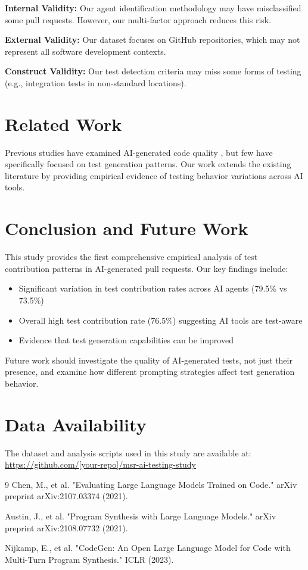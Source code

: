\documentclass[conference]{IEEEtran}
\begin{document}
\textbf{Internal Validity:} Our agent identification methodology may have misclassified some pull requests. However, our multi-factor approach reduces this risk.

\textbf{External Validity:} Our dataset focuses on GitHub repositories, which may not represent all software development contexts.

\textbf{Construct Validity:} Our test detection criteria may miss some forms of testing (e.g., integration tests in non-standard locations).

\section{Related Work}

Previous studies have examined AI-generated code quality \cite{ref1}, but few have specifically focused on test generation patterns. Our work extends the existing literature by providing empirical evidence of testing behavior variations across AI tools.

\section{Conclusion and Future Work}

This study provides the first comprehensive empirical analysis of test contribution patterns in AI-generated pull requests. Our key findings include:

\begin{itemize}
    \item Significant variation in test contribution rates across AI agents (79.5\% vs 73.5\%)
    \item Overall high test contribution rate (76.5\%) suggesting AI tools are test-aware
    \item Evidence that test generation capabilities can be improved
\end{itemize}

Future work should investigate the quality of AI-generated tests, not just their presence, and examine how different prompting strategies affect test generation behavior.

\section{Data Availability}

The dataset and analysis scripts used in this study are available at: \url{https://github.com/[your-repo]/msr-ai-testing-study}

\begin{thebibliography}{9}
 Chen, M., et al. "Evaluating Large Language Models Trained on Code." arXiv preprint arXiv:2107.03374 (2021).

 Austin, J., et al. "Program Synthesis with Large Language Models." arXiv preprint arXiv:2108.07732 (2021).

 Nijkamp, E., et al. "CodeGen: An Open Large Language Model for Code with Multi-Turn Program Synthesis." ICLR (2023).
\end{thebibliography}
\end{document}
